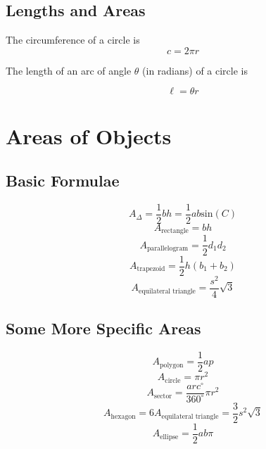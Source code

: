 \documentclass[final, letterpaper, 12pt]{article}
\begin{document}
	\subsection{Lengths and Areas}\label{sec: arc lengths and the area of segment and sector}
		The circumference of a circle is 
		\begin{equation}
			c = 2 \pi r
		\end{equation}
		
		The length of an arc of angle $\theta$ (in radians) of a circle is
		
		\begin{equation}
			\ell = \theta r
		\end{equation}		
		
\section{Areas of Objects}
	\subsection{Basic Formulae}\label{sec: basic area formulae}
		\begin{equation}
			A_{\Delta} = \frac{1}{2}bh = \frac{1}{2}ab{\text{sin}}(C)
		\end{equation}
		\begin{equation}
			A_\text{rectangle} = bh
		\end{equation}
		\begin{equation}
			A_\text{parallelogram} = \frac{1}{2}d_1d_2 %
		\end{equation}
		\begin{equation}
			A_\text{trapezoid} = \frac{1}{2}h\left(b_1 + b_2\right)
		\end{equation}
		\begin{equation}
			A_\text{equilateral triangle} = \frac{s^2}{4}\sqrt{3}
		\end{equation}
	\subsection{Some More Specific Areas}\label{sec: some interesting area formulae}
		\begin{equation}
			A_\text{polygon} = \frac{1}{2}ap %
		\end{equation}
		\begin{equation}
			A_\text{circle} = \pi r^2
		\end{equation}
		\begin{equation}
			A_\text{sector} = \frac{arc ^{\circ}}{360^{\circ}}\pi r^2
		\end{equation}
		\begin{equation}
			A_\text{hexagon} = 6A_\text{equilateral triangle} = \frac{3}{2}s^2\sqrt{3}
		\end{equation}
		\begin{equation}
			A_\text{ellipse} = \frac{1}{2}ab{\pi}
		\end{equation}
\end{document}
